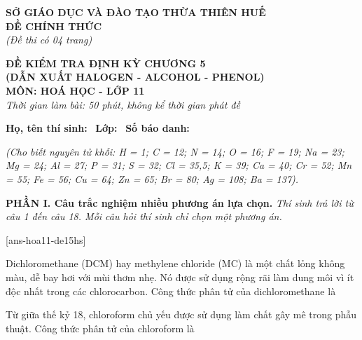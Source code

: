 \documentclass[12pt,a4paper]{article}
\begin{document}
\thispagestyle{firstpage}

\noindent
\begin{minipage}[t]{0.44\textwidth}
	\centering\fontsize{10pt}{12pt}\selectfont
	\textbf{SỞ GIÁO DỤC VÀ ĐÀO TẠO THỪA THIÊN HUẾ}\\
	\textbf{ĐỀ CHÍNH THỨC}\\
	\textit{(Đề thi có 04 trang)}
\end{minipage}\hfill
\begin{minipage}[t]{0.54\textwidth}
	\centering\fontsize{10.5pt}{13pt}\selectfont
	\textbf{ĐỀ KIỂM TRA ĐỊNH KỲ CHƯƠNG 5}\\
	\textbf{(DẪN XUẤT HALOGEN - ALCOHOL - PHENOL)}\\
	\textbf{MÔN: HOÁ HỌC - LỚP 11}\\
	\textit{Thời gian làm bài: 50 phút, không kể thời gian phát đề}
	
	\smallskip
\end{minipage}

\smallskip
\noindent\hrulefill
\smallskip

\noindent\textbf{Họ, tên thí sinh:} \dotfill\ \textbf{Lớp:} \dotfill\ \textbf{Số báo danh:} \dotfill

\smallskip
\noindent\textit{(Cho biết nguyên tử khối: H = 1; C = 12; N = 14; O = 16; F = 19; Na = 23; Mg = 24; Al = 27; P = 31; S = 32; Cl = 35,5; K = 39; Ca = 40; Cr = 52; Mn = 55; Fe = 56; Cu = 64; Zn = 65; Br = 80; Ag = 108; Ba = 137).}
\smallskip

\noindent\textbf{\large PHẦN I. Câu trắc nghiệm nhiều phương án lựa chọn.}
\textit{Thí sinh trả lời từ câu 1 đến câu 18. Mỗi câu hỏi thí sinh chỉ chọn một phương án.}
\vspace{0.2cm}

[ans-hoa11-de15hs]

\begin{ex}
Dichloromethane (DCM) hay methylene chloride (MC) là một chất lỏng không màu, dễ bay hơi với mùi thơm nhẹ. Nó được sử dụng rộng rãi làm dung môi vì ít độc nhất trong các chlorocarbon. Công thức phân tử của dichloromethane là
\choice
{\True {}}
{}
{}
{}
\end{ex}

\begin{ex}
Từ giữa thế kỷ 18, chloroform chủ yếu được sử dụng làm chất gây mê trong phẫu thuật. Công thức phân tử của chloroform là
\choice
{}
{}
{\True {}}
{}
\end{ex}
\end{document}
